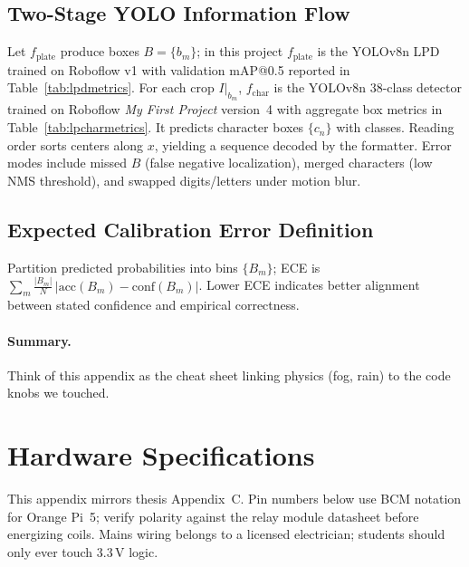 \documentclass[10pt, conference]{IEEEtran}
\begin{document}
\subsection{Two-Stage YOLO Information Flow}
Let $f_{\mathrm{plate}}$ produce boxes $B=\{b_m\}$; in this project $f_{\mathrm{plate}}$ is the YOLOv8n LPD trained on Roboflow v1 with validation mAP@0.5 reported in Table~\ref{tab:lpdmetrics}. For each crop $I|_{b_m}$, $f_{\mathrm{char}}$ is the YOLOv8n 38-class detector trained on Roboflow \emph{My First Project} version~4 with aggregate box metrics in Table~\ref{tab:lpcharmetrics}. It predicts character boxes $\{c_n\}$ with classes. Reading order sorts centers along $x$, yielding a sequence decoded by the formatter. Error modes include missed $B$ (false negative localization), merged characters (low NMS threshold), and swapped digits/letters under motion blur.

\subsection{Expected Calibration Error Definition}
Partition predicted probabilities into bins $\{B_m\}$; ECE is $\sum_m \frac{|B_m|}{N}\,|\mathrm{acc}(B_m)-\mathrm{conf}(B_m)|$. Lower ECE indicates better alignment between stated confidence and empirical correctness.

\paragraph{Summary.} Think of this appendix as the cheat sheet linking physics (fog, rain) to the code knobs we touched.

\section{Hardware Specifications}
\label{app:hw}
This appendix mirrors thesis Appendix~C. Pin numbers below use BCM notation for Orange Pi~5; verify polarity against the relay module datasheet before energizing coils. Mains wiring belongs to a licensed electrician; students should only ever touch 3.3\,V logic.
\end{document}
